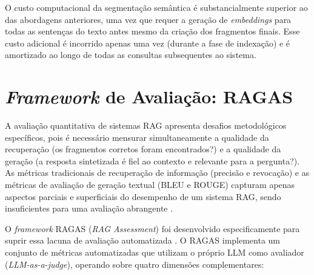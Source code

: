 \documentclass[
	12pt,				%
	openright,			%
	oneside,			%
	a4paper,			%
	tccpreliminar,		%
	]{ABNT-DC-UEL}
\begin{document}
O custo computacional da segmentação semântica é substancialmente superior ao das abordagens anteriores, uma vez que requer a geração de \textit{embeddings} para todas as sentenças do texto antes mesmo da criação dos fragmentos finais. Esse custo adicional é incorrido apenas uma vez (durante a fase de indexação) e é amortizado ao longo de todas as consultas subsequentes ao sistema.


\section{\textit{Framework} de Avaliação: RAGAS}
\label{sec:ragas}

A avaliação quantitativa de sistemas RAG apresenta desafios metodológicos específicos, pois é necessário mensurar simultaneamente a qualidade da recuperação (os fragmentos corretos foram encontrados?) e a qualidade da geração (a resposta sintetizada é fiel ao contexto e relevante para a pergunta?). As métricas tradicionais de recuperação de informação (precisão e revocação) e as métricas de avaliação de geração textual (BLEU e ROUGE) capturam apenas aspectos parciais e superficiais do desempenho de um sistema RAG, sendo insuficientes para uma avaliação abrangente \cite{salemi2024evaluating}.

O \textit{framework} RAGAS (\textit{RAG Assessment}) foi desenvolvido especificamente para suprir essa lacuna de avaliação automatizada \cite{ragas2024}. O RAGAS implementa um conjunto de métricas automatizadas que utilizam o próprio LLM como avaliador (\textit{LLM-as-a-judge}), operando sobre quatro dimensões complementares:
\end{document}
